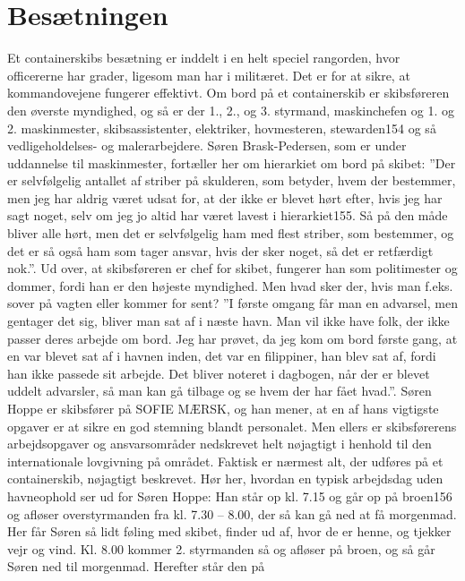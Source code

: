 \chapter{Besætningen}\label{besuxe6tningen}

Et containerskibs besætning er inddelt i en helt speciel rangorden, hvor
officererne har grader, ligesom man har i militæret. Det er for at
sikre, at kommandovejene fungerer effektivt. Om bord på et containerskib
er skibsføreren den øverste myndighed, og så er der 1., 2., og 3.
styrmand, maskinchefen og 1. og 2. maskinmester, skibsassistenter,
elektriker, hovmesteren, stewarden154 og så vedligeholdelses- og
malerarbejdere. Søren Brask-Pedersen, som er under uddannelse til
maskinmester, fortæller her om hierarkiet om bord på skibet: ''Der er
selvfølgelig antallet af striber på skulderen, som betyder, hvem der
bestemmer, men jeg har aldrig været udsat for, at der ikke er blevet
hørt efter, hvis jeg har sagt noget, selv om jeg jo altid har været
lavest i hierarkiet155. Så på den måde bliver alle hørt, men det er
selvfølgelig ham med flest striber, som bestemmer, og det er så også ham
som tager ansvar, hvis der sker noget, så det er retfærdigt nok.''. Ud
over, at skibsføreren er chef for skibet, fungerer han som politimester
og dommer, fordi han er den højeste myndighed. Men hvad sker der, hvis
man f.eks. sover på vagten eller kommer for sent? ''I første omgang får
man en advarsel, men gentager det sig, bliver man sat af i næste havn.
Man vil ikke have folk, der ikke passer deres arbejde om bord. Jeg har
prøvet, da jeg kom om bord første gang, at en var blevet sat af i havnen
inden, det var en filippiner, han blev sat af, fordi han ikke passede
sit arbejde. Det bliver noteret i dagbogen, når der er blevet uddelt
advarsler, så man kan gå tilbage og se hvem der har fået hvad.''. Søren
Hoppe er skibsfører på SOFIE MÆRSK, og han mener, at en af hans
vigtigste opgaver er at sikre en god stemning blandt personalet. Men
ellers er skibsførerens arbejdsopgaver og ansvarsområder nedskrevet helt
nøjagtigt i henhold til den internationale lovgivning på området.
Faktisk er nærmest alt, der udføres på et containerskib, nøjagtigt
beskrevet. Hør her, hvordan en typisk arbejdsdag uden havneophold ser ud
for Søren Hoppe: Han står op kl. 7.15 og går op på broen156 og afløser
overstyrmanden fra kl. 7.30 -- 8.00, der så kan gå ned at få morgenmad.
Her får Søren så lidt føling med skibet, finder ud af, hvor de er henne,
og tjekker vejr og vind. Kl. 8.00 kommer 2. styrmanden så og afløser på
broen, og så går Søren ned til morgenmad. Herefter står den på
